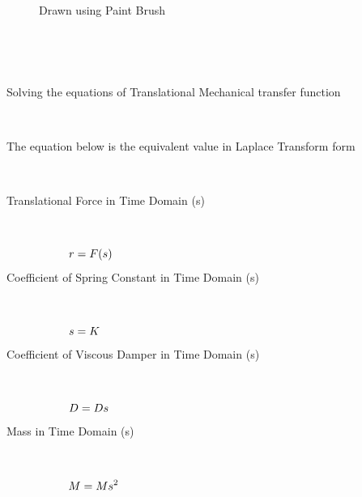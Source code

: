 \documentclass[10pt,a4paper,leqno]{article}
\begin{document}
\begin{CJK*}{UTF8}{gbsn}
\begin{figure}[H]
\caption{Drawn using Paint Brush}
\label{fig:Data/ExerciseFig.png}
\end{figure}

\noindent \par \ \par
 \par \ \par\noindent Solving the equations of Translational Mechanical transfer function 
 \par \ \par\noindent The equation below is the equivalent value in Laplace Transform form
 \par \ \par\noindent Translational Force in Time Domain (s)
 \par \ \par\begin{equation}
 \begin{minipage}{250pt}
                \begin{flushleft} $\displaystyle r = F(s)$  \end{flushleft}
 \end{minipage}
 \end{equation}
\noindent Coefficient of Spring Constant in Time Domain (s)
 \par \ \par\begin{equation}
 \begin{minipage}{250pt}
                \begin{flushleft} $\displaystyle s = K$  \end{flushleft}
 \end{minipage}
 \end{equation}
\noindent Coefficient of Viscous Damper in Time Domain (s)
 \par \ \par\begin{equation}
 \begin{minipage}{250pt}
                \begin{flushleft} $\displaystyle D = Ds$  \end{flushleft}
 \end{minipage}
 \end{equation}
\noindent Mass in Time Domain (s)
 \par \ \par\begin{equation}
 \begin{minipage}{250pt}
                \begin{flushleft} $\displaystyle M = Ms^{2}$  \end{flushleft}

\end{minipage}
\end{equation}
\end{CJK*}
\end{document}
